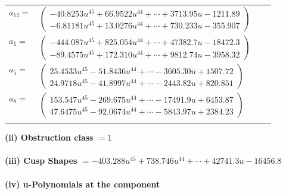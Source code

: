 \documentclass[1p]{elsarticle_modified}
\theoremstyle{definition}
\begin{document}
\begin{tabular}{m{7pt} m{180pt} m{7pt} m{180pt} }
\flushright $a_{12}=$&$\begin{pmatrix}-40.8253 u^{45}+66.9522 u^{44}+\cdots+3713.95 u-1211.89\\-6.81181 u^{45}+13.0276 u^{44}+\cdots+730.233 u-355.907\end{pmatrix}$ \\
\flushright $a_{1}=$&$\begin{pmatrix}-444.087 u^{45}+825.054 u^{44}+\cdots+47382.7 u-18472.3\\-89.4575 u^{45}+172.310 u^{44}+\cdots+9812.74 u-3958.32\end{pmatrix}$ \\
\flushright $a_{5}=$&$\begin{pmatrix}25.4533 u^{45}-51.8436 u^{44}+\cdots-3605.30 u+1507.72\\24.9718 u^{45}-41.8997 u^{44}+\cdots-2443.82 u+820.851\end{pmatrix}$ \\
\flushright $a_{8}=$&$\begin{pmatrix}153.547 u^{45}-269.675 u^{44}+\cdots-17491.9 u+6453.87\\47.6475 u^{45}-92.0674 u^{44}+\cdots-5843.97 u+2384.23\end{pmatrix}$\\&\end{tabular}
\flushleft \textbf{(ii) Obstruction class $= 1$}\\~\\
\flushleft \textbf{(iii) Cusp Shapes $= -403.288 u^{45}+738.746 u^{44}+\cdots+42741.3 u-16456.8$}\\~\\
\newpage\renewcommand{\arraystretch}{1}
\flushleft \textbf{(iv) u-Polynomials at the component}\newline \\
\end{document}
